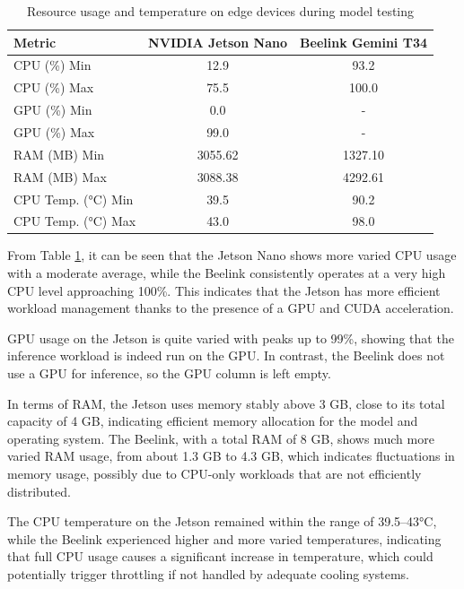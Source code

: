 \begin{table}[htbp]
  \centering
  \setlength{\tabcolsep}{4pt}
  \footnotesize
  \begin{tabular}{|l|c|c|}
  \hline
  \rowcolor[HTML]{C0C0C0}
  \textbf{Metric} & \textbf{NVIDIA Jetson Nano} & \textbf{Beelink Gemini T34} \\
  \hline
  CPU (\%) Min & 12.9 & 93.2 \\
  \hline
  CPU (\%) Max & 75.5 & 100.0 \\
  \hline
  GPU (\%) Min & 0.0 & - \\
  \hline
  GPU (\%) Max & 99.0 & - \\
  \hline
  RAM (MB) Min & 3055.62 & 1327.10 \\
  \hline
  RAM (MB) Max & 3088.38 & 4292.61 \\
  \hline
  CPU Temp. (°C) Min & 39.5 & 90.2 \\
  \hline
  CPU Temp. (°C) Max & 43.0 & 98.0 \\
  \hline
  \end{tabular}
  \caption{Resource usage and temperature on edge devices during model testing}
  \label{tab:resource_usage}
\end{table}

From Table \ref{tab:resource_usage}, it can be seen that the Jetson Nano shows more varied CPU usage with a moderate average, while the Beelink consistently operates at a very high CPU level approaching 100\%. This indicates that the Jetson has more efficient workload management thanks to the presence of a GPU and CUDA acceleration.

GPU usage on the Jetson is quite varied with peaks up to 99\%, showing that the inference workload is indeed run on the GPU. In contrast, the Beelink does not use a GPU for inference, so the GPU column is left empty.

In terms of RAM, the Jetson uses memory stably above 3 GB, close to its total capacity of 4 GB, indicating efficient memory allocation for the model and operating system. The Beelink, with a total RAM of 8 GB, shows much more varied RAM usage, from about 1.3 GB to 4.3 GB, which indicates fluctuations in memory usage, possibly due to CPU-only workloads that are not efficiently distributed.

The CPU temperature on the Jetson remained within the range of 39.5--43°C, while the Beelink experienced higher and more varied temperatures, indicating that full CPU usage causes a significant increase in temperature, which could potentially trigger throttling if not handled by adequate cooling systems.

